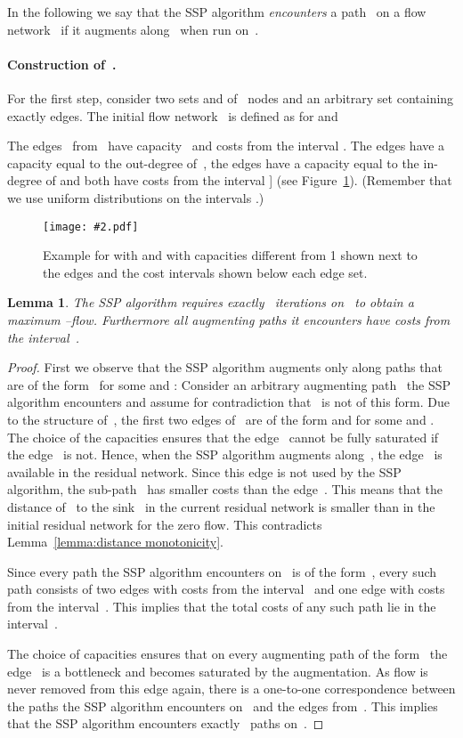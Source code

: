 \documentclass[11pt]{article}
\newtheorem{lemma}[theorem]{Lemma}
\newcommand{\GFX}[2][]{\texttt{[image: \#2.pdf]}}
\newenvironment{fig}
{\begin{figure}[th]\begin{center}}
{\end{center}\end{figure}}
\begin{document}
In the following we say that the SSP algorithm \emph{encounters} a path~ on a flow network~ if it augments along~
when run on~.

\paragraph{Construction of~.}
For the first step, consider two sets  and  of~ nodes and an arbitrary set  containing exactly  edges. The initial flow network~ is defined as  for  and

The edges~ from~ have capacity~ and costs from the interval . 
The edges  have a capacity equal to the out-degree of~, 
the edges  have a capacity equal to the in-degree of  and both have costs from the interval ] (see Figure~\ref{fig:step I}).
(Remember that we use uniform distributions on the intervals .)
\begin{fig}
  \GFX[width=0.5\textwidth]{Initialgraph}
 \caption[]
   {Example for  with  and  with capacities different from 1 shown next to the edges and the cost intervals shown below each edge set.} 
  \label{fig:step I}
\end{fig}

\begin{lemma}
\label{lemma:step I}
The SSP algorithm requires exactly~ iterations on~ to obtain a maximum --flow. Furthermore all augmenting paths it
encounters have costs from the interval~.
\end{lemma}
\begin{proof}
First we observe that the SSP algorithm augments only along paths that are of the form~ for some  and :
Consider an arbitrary augmenting path~ the SSP algorithm encounters and assume for contradiction that~ is not of this form.
Due to the structure of~, the first two edges of~ are of the form  and  for some  
and . The choice of the capacities ensures that the edge~ cannot be fully saturated if the edge~ is not.
Hence, when the SSP algorithm augments along~, the edge~ is available in the residual network.
Since this edge is not used by the SSP algorithm, the sub-path~ has smaller costs than the edge~.
This means that the distance of~ to the sink~ in the current residual network is smaller than in the initial residual network
for the zero flow. This contradicts Lemma~\ref{lemma:distance monotonicity}.

Since every path the SSP algorithm encounters on~ is of the form~, every such path consists of two edges with
costs from the interval~ and one edge with costs from the interval~. This implies that the total costs of any such path 
lie in the interval~.

The choice of capacities ensures that on every augmenting path of the form~ the edge~ is a bottleneck
and becomes saturated by the augmentation. As flow is never removed from this edge again, there is a one-to-one correspondence between
the paths the SSP algorithm encounters on~ and the edges from~. This implies that the SSP algorithm encounters
exactly~ paths on~. 
\end{proof}
\end{document}
